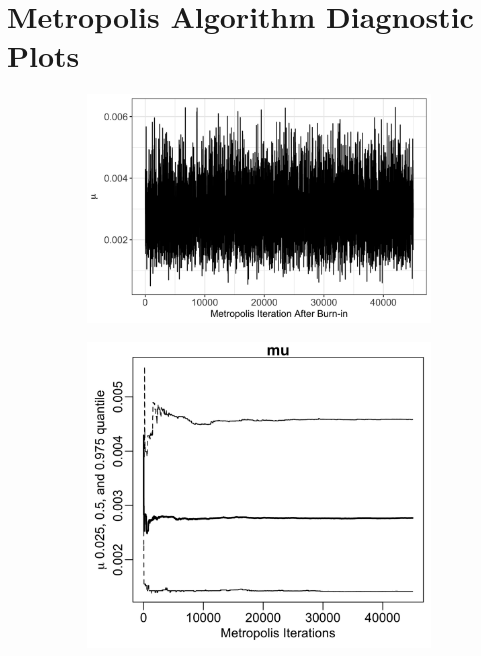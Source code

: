 \documentclass{uwstat572}
\begin{document}
\newpage


\newpage
\appendix
\section{Metropolis Algorithm Diagnostic Plots}
\label{metropolis_plots}

\begin{figure}[H]
	\centering
	\begin{subfigure}[b]{\textwidth}
		\includegraphics[width=\textwidth]{figures/mu_mcmc_chain.png}
		\caption{}
	\label{fig:chain_mu}
	\end{subfigure}
	\qquad
	\begin{subfigure}[b]{0.49\textwidth}
		\includegraphics[width=\textwidth]{figures/mcmc_cum_quant_plot_mu.png}

\end{subfigure}
\end{figure}
\end{document}
